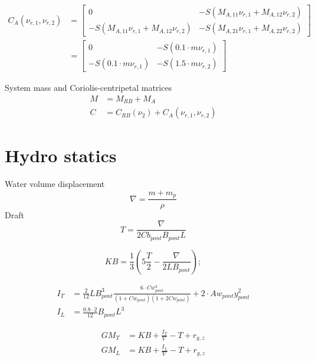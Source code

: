 \documentclass[12pt,a4]{article}
\begin{document}
\begin{align}
	C_A(\nu_{r,1},\nu_{r,2}) & =
	\begin{bmatrix}
		0                                         & -S(M_{A,11}\nu_{r,1} + M_{A,12}\nu_{r,2}) \\
		-S(M_{A,11}\nu_{r,1} + M_{A,12}\nu_{r,2}) & -S(M_{A,21}\nu_{r,1} + M_{A,22}\nu_{r,2})
	\end{bmatrix}   \\
	                         & =
	\begin{bmatrix}
		0                        & -S(0.1 \cdot m\nu_{r,1}) \\
		-S(0.1 \cdot m\nu_{r,1}) & -S(1.5 \cdot m\nu_{r,2})
	\end{bmatrix}
\end{align}

System mass and Coriolis-centripetal matrices
\begin{align}
	M & = M_{RB} + M_A                             \\
	C & = C_{RB}(\nu_2) + C_A(\nu_{r,1},\nu_{r,2})
\end{align}


\section{Hydro statics}
Water volume displacement
\begin{equation}
	\nabla = \frac{m+m_p}{\rho}
\end{equation}
Draft
\begin{equation}
	T = \frac{\nabla}{2 Cb_{pont} B_{pont} L}     %
\end{equation}

\begin{equation}
	KB = \frac{1}{3}(5\frac{T}{2} - \frac{\nabla}{2 L B_{pont}});
\end{equation}

\begin{align}
	I_T & = \frac{2}{12} L B_{pont}^3 \frac{6\cdot Cw_{pont}^3}{(1+Cw_{pont})(1+2Cw_{pont})} + 2 \cdot Aw_{pont} y_{pont}^2 \\
	I_L & = \frac{0.8\cdot 2}{12}  B_{pont}  L^3
\end{align}

\begin{align}
	GM_T & = KB + \frac{I_T}{\nabla} - T + r_{g,z}  \\
	GM_L & = KB + \frac{I_L}{\nabla}  - T + r_{g,z} \\
\end{align}
\end{document}
